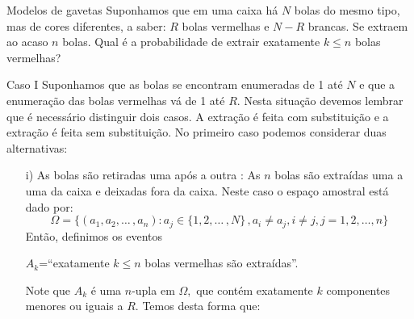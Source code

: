 \begin{frame}
\begin{exem}{Modelos de gavetas} Suponhamos que em uma caixa há $N$ bolas do mesmo tipo, mas de cores diferentes, a saber: $R$ bolas
vermelhas e $N-R$ brancas. Se extraem ao  acaso $n$ bolas. Qual é  a probabilidade de extrair exatamente $k \leq n$ bolas vermelhas?
\end{exem}

\begin{block}{Caso I}
Suponhamos que as bolas se encontram  enumeradas de 1 até $N$ e que a enumeração das bolas vermelhas vá de 1 até $R$. Nesta situação devemos lembrar que é necessário distinguir dois casos. A extração é feita com substituição  e a  extração é feita sem substituição. No primeiro caso podemos considerar duas alternativas: 

\begin{enumerate}
\item[i)] As bolas são retiradas uma após a outra : As $n$ bolas são extraídas uma a uma da caixa e deixadas fora da caixa. Neste caso o espaço 
amostral está dado por:
$$\Omega= \{ (a_1, a_2, \dots \, , a_n): a_j \in \{1,2,\dots \, , N \} \, , a_i \not= a_j, i \not= j, j=1,2, \dots , n \}$$  
Então, definimos os eventos 
\begin{center}
$A_k$=``exatamente $k \leq n$ bolas vermelhas são extraídas''.
\end{center}
Note que $A_k$ é uma $n$-upla em $\Omega ,$ que contém exatamente $k$ componentes menores ou iguais a $R$. Temos desta forma que: 



\end{enumerate}
\end{block}
\end{frame}



